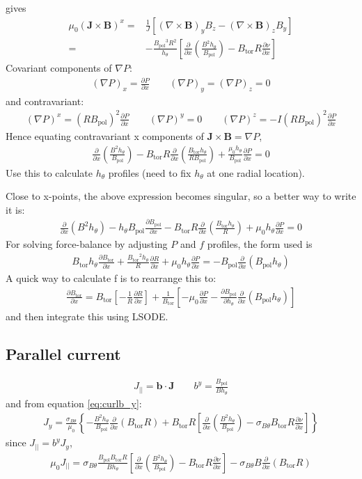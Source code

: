 \documentclass[12pt]{article}
\def\L{\left}
\def\R{\right}
\newcommand{\sbt}{\ensuremath{\sigma_{B\theta}}}
\newcommand{\deriv}[2]{\ensuremath{\frac{\partial #1}{\partial #2}}}
\newcommand{\hthe}{\ensuremath{h_\theta}}
\newcommand{\Bp}{\ensuremath{B_{\text{pol}}}}
\newcommand{\Bt}{\ensuremath{B_{\text{tor}}}}
\newcommand{\ve}[1]{\ensuremath{\boldsymbol{#1}}}
\newcommand{\bvec}{\ve{b}}
\newcommand{\Bvec}{\ve{B}}
\newcommand{\Jvec}{\ve{J}}
\newcommand{\Curl}[1]{\ensuremath{\nabla\times #1 }}
\newcommand{\rbp}{\ensuremath{R\Bp}}
\newcommand{\rbpsq}{\ensuremath{\L(\rbp\R)^2}}
\begin{document}
%
gives
%
\begin{align*}
\mu_0 \L(\Jvec\times\Bvec\R)^x =& \frac{1}{J}\L[\L(\Curl{\Bvec}\R)_y B_z -
\L(\Curl{\Bvec}\R)_z B_y \R]\\ =& -\frac{\Bp^3
R^2}{\hthe}\L[\deriv{}{x}\L(\frac{B^2\hthe}{\Bp}\R) - \Bt R\deriv{\nu}{x}\R]
\end{align*}
%
Covariant components of $\nabla P$:
%
\begin{align*}
\L(\nabla P\R)_x = \deriv{P}{x} \qquad \L(\nabla P\R)_y = \L(\nabla P\R)_z = 0
\end{align*}
%
and contravariant:
%
\begin{align*}
\L(\nabla P\R)^x = \rbpsq\deriv{P}{x} \qquad \L(\nabla P\R)^y = 0 \qquad
\L(\nabla P\R)^z = -I\rbpsq\deriv{P}{x}
\end{align*}
%
Hence equating contravariant x components of $\Jvec\times\Bvec = \nabla P$,
%
\begin{align}
\deriv{}{x}\L(\frac{B^2\hthe}{\Bp}\R) - \Bt
R\deriv{}{x}\L(\frac{\Bt\hthe}{R\Bp}\R) + \frac{\mu_0\hthe}{\Bp}\deriv{P}{x} =
0
\label{eq:xbalance}
\end{align}
%
Use this to calculate $\hthe$ profiles (need to fix $\hthe$ at one radial
location).

Close to x-points, the above expression becomes singular, so a better way to
write it is:
%
\begin{align*}
\deriv{}{x}\L(B^2\hthe\R) - \hthe\Bp\deriv{\Bp}{x} - \Bt
R\deriv{}{x}\L(\frac{\Bt\hthe}{R}\R) + \mu_0\hthe\deriv{P}{x} = 0
\end{align*}
%
For solving force-balance by adjusting $P$ and $f$ profiles, the form used is
%
\begin{align*}
\Bt\hthe\deriv{\Bt}{x} + \frac{\Bt^2\hthe}{R}\deriv{R}{x} +
\mu_0\hthe\deriv{P}{x} = -\Bp\deriv{}{x}\L(\Bp\hthe\R)
\end{align*}
%
A quick way to calculate f is to rearrange this to:
%
\begin{align*}
\deriv{\Bt}{x} = \Bt\L[-\frac{1}{R}\deriv{R}{x}\R] +
\frac{1}{\Bt}\L[-\mu_0\deriv{P}{x} -
\deriv{\Bp}{\hthe}\deriv{}{x}\L(\Bp\hthe\R)\R]
\end{align*}
%
and then integrate this using LSODE.



\subsection{Parallel current}
%
\begin{align*}
J_{||} = \bvec\cdot\Jvec \qquad b^y = \frac{\Bp}{B\hthe}
\end{align*}
%
and from equation \ref{eq:curlb_y}:
%
\begin{align*}
J_y = \frac{\sbt}{\mu_0}\L\{-\frac{B^2\hthe}{\Bp}\deriv{}{x}\L(\Bt R\R) + \Bt
R\L[\deriv{}{x}\L(\frac{B^2\hthe}{\Bp}\R) - \sbt\Bt R\deriv{\nu}{x}\R]\R\}
\end{align*}
%
since $J_{||} = b^yJ_y$,
%
\begin{align*}
\mu_0 J_{||} =\sbt\frac{\Bp\Bt
R}{B\hthe}\L[\deriv{}{x}\L(\frac{B^2\hthe}{\Bp}\R) - \Bt R\deriv{\nu}{x}\R] -
\sbt B\deriv{}{x}\L(\Bt R\R)
\end{align*}
%
\end{document}
